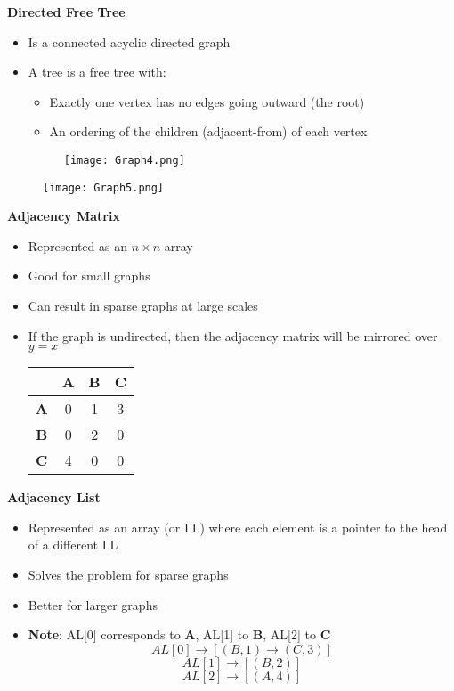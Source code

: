 \documentclass[10pt, 
a4paper, 
oneside, 
headinclude, footinclude, 
BCOR5mm]
{scrartcl}
\begin{document}
\textbf{Directed Free Tree}
\begin{itemize}
    \item Is a connected acyclic directed graph
    \item A tree is a free tree with:
    \begin{itemize}
        \item Exactly one vertex has no edges going outward (the root)
        \item An ordering of the children (adjacent-from) of each vertex
    \end{itemize}
    \begin{figure}[H]
        \begin{center}
            \texttt{[image: Graph4.png]}
        \end{center}
    \end{figure}
\end{itemize}
\begin{figure}[H]
    \begin{center}
        \texttt{[image: Graph5.png]}
    \end{center}
\end{figure}
\textbf{Adjacency Matrix}
\begin{itemize}
    \item Represented as an $n \times n$ array
    \item Good for small graphs
    \item Can result in sparse graphs at large scales
    \item If the graph is undirected, then the adjacency matrix will be mirrored over $y=x$
    \begin{center}
        \begin{tabular}{|c|c|c|c|}
            \hline
             & \textbf{A} & \textbf{B} & \textbf{C} \\
            \hline
            \textbf{A} & 0 & 1 & 3 \\
            \hline
            \textbf{B} & 0 & 2 & 0 \\
            \hline
            \textbf{C} & 4 & 0 & 0 \\
            \hline
        \end{tabular}
    \end{center}
\end{itemize}
\textbf{Adjacency List}
\begin{itemize}
    \item Represented as an array (or LL) where each element is a pointer to the head of a different LL
    \item Solves the problem for sparse graphs 
    \item Better for larger graphs 
    \item \textbf{Note}: AL[0] corresponds to \textbf{A}, AL[1] to \textbf{B}, AL[2] to \textbf{C} $$AL[0]\rightarrow [(B,1)\rightarrow (C,3)]$$ 
    $$AL[1]\rightarrow [(B,2)]$$ $$AL[2]\rightarrow [(A,4)]$$ 
\end{itemize}
\newpage
\end{document}
